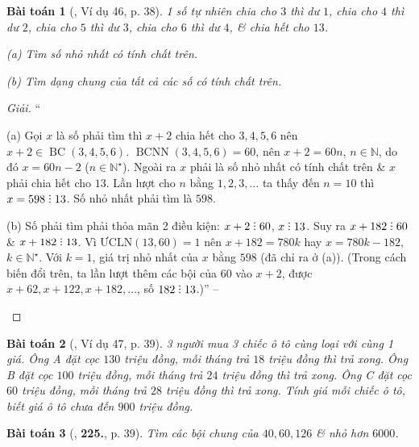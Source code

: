 \documentclass{article}
\numberwithin{equation}{section}
\newtheorem{baitoan}{Bài toán}[section]
\DeclareRobustCommand{\divby}{%
	\mathrel{\vbox{\baselineskip.65ex\lineskiplimit0pt\hbox{.}\hbox{.}\hbox{.}}}%
}
\begin{document}
\begin{baitoan}[\cite{Binh_Toan_6_tap_1}, Ví dụ 46, p. 38]
	1 số tự nhiên chia cho $3$ thì dư $1$, chia cho $4$ thì dư $2$, chia cho $5$ thì dư $3$, chia cho $6$ thì dư $4$, \& chia hết cho $13$.
	\begin{enumerate*}
		\item[(a)] Tìm số nhỏ nhất có tính chất trên.
		\item[(b)] Tìm dạng chung của tất cả các số có tính chất trên.
	\end{enumerate*}
\end{baitoan}

\begin{proof}[Giải]
	``\begin{enumerate*}
		\item[(a)] Gọi $x$ là số phải tìm thì $x + 2$ chia hết cho $3,4,5,6$ nên $x + 2\in\operatorname{BC}(3,4,5,6)$. $\operatorname{BCNN}(3,4,5,6) = 60$, nên $x + 2 = 60n$, $n\in\mathbb{N}$, do đó $x = 60n - 2$ ($n\in\mathbb{N}^\star$). Ngoài ra $x$ phải là số nhỏ nhất có tính chất trên \& $x$ phải chia hết cho $13$. Lần lượt cho $n$ bằng $1,2,3,\ldots$ ta thấy đến $n = 10$ thì $x = 598\divby 13$. Số nhỏ nhất phải tìm là $598$.
		\item[(b)] Số phải tìm phải thỏa mãn 2 điều kiện: $x + 2\divby 60$, $x\divby 13$. Suy ra $x + 182\divby 60$ \& $x + 182\divby 13$. Vì $\mbox{ƯCLN}(13,60) = 1$ nên $x + 182 = 780k$ hay $x = 780k - 182$, $k\in\mathbb{N}^\star$. Với $k = 1$, giá trị nhỏ nhất của $x$ bằng $598$ (đã chỉ ra ở (a)). (Trong cách biến đổi trên, ta lần lượt thêm các bội của $60$ vào $x + 2$, được $x + 62,x + 122,x + 182,\ldots$, số $182\divby 13$.)'' -- \cite[p. 38]{Binh_Toan_6_tap_1}
	\end{enumerate*}
\end{proof}


\begin{baitoan}[\cite{Binh_Toan_6_tap_1}, Ví dụ 47, p. 39]
	3 người mua 3 chiếc ô tô cùng loại với cùng 1 giá. Ông A đặt cọc $130$ triệu đồng, mỗi tháng trả $18$ triệu đồng thì trả xong. Ông B đặt cọc $100$ triệu đồng, mỗi tháng trả $24$ triệu đồng thì trả xong. Ông C đặt cọc $60$ triệu đồng, mỗi tháng trả $28$ triệu đồng thì trả xong. Tính giá mỗi chiếc ô tô, biết giá ô tô chưa đến $900$ triệu đồng.
\end{baitoan}

\begin{baitoan}[\cite{Binh_Toan_6_tap_1}, \textbf{225.}, p. 39]
	Tìm các bội chung của $40,60,126$ \& nhỏ hơn $6000$.
\end{baitoan}
\end{document}
